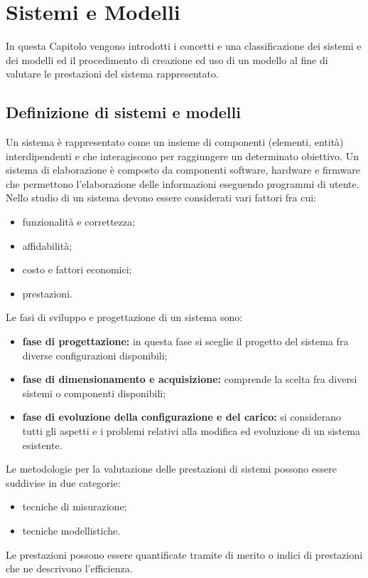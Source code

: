 \chapter{Sistemi e Modelli}
In questa Capitolo vengono introdotti i concetti e una classificazione dei sistemi e
dei modelli ed il procedimento di creazione ed uso di un modello al fine di valutare le
prestazioni del sistema rappresentato.

\section{Definizione di sistemi e modelli}
Un sistema è rappresentato come un insieme di componenti (elementi, entità) interdipendenti e che interagiscono per raggiungere un determinato obiettivo. Un sistema di elaborazione è composto da componenti software, hardware e firmware che permettono l'elaborazione delle informazioni eseguendo programmi di utente.\\
Nello studio di un sistema devono essere considerati vari fattori fra cui:
\begin{itemize}
    \item funzionalità e correttezza;
    \item affidabilità;
    \item costo e fattori economici;
    \item prestazioni.
\end{itemize}
Le fasi di sviluppo e progettazione di un sistema sono:
\begin{itemize}
    \item \textbf{fase di progettazione:} in questa fase si sceglie il progetto del sistema fra diverse configurazioni disponibili;
    \item \textbf{fase di dimensionamento e acquisizione:} comprende la scelta fra diversi sistemi o componenti disponibili;
    \item \textbf{fase di evoluzione della configurazione e del carico:} si considerano tutti gli aspetti e i problemi relativi alla modifica ed evoluzione di un sistema esistente.
\end{itemize}
Le metodologie per la valutazione delle prestazioni di sistemi possono essere suddivise in due categorie:
\begin{itemize}
    \item tecniche di misurazione;
    \item tecniche modellistiche.
\end{itemize}
Le prestazioni possono essere quantificate tramite  di merito o indici di prestazioni che ne descrivono l'efficienza.
